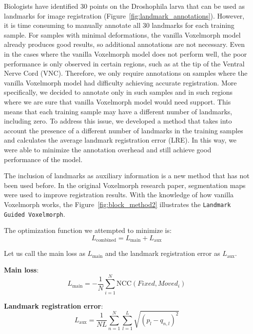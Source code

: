 \documentclass{book}
\begin{document}
	Biologists have identified 30 points on the Droshophila larva that can be used as landmarks for image registration (Figure~\ref{fig:landmark_annotations}). However, it is time consuming to manually annotate all 30 landmarks for each training sample. For samples with minimal deformations, the vanilla Voxelmorph model already produces good results, so additional annotations are not necessary. Even in the cases where the vanilla Voxelmorph model does not perform well, the poor performance is only observed in certain regions, such as at the tip of the Ventral Nerve Cord (VNC). Therefore, we only require annotations on samples where the vanilla Voxelmorph model had difficulty achieving accurate registration. More specifically, we decided to annotate only in such samples and in such regions where we are sure that vanilla Voxelmorph model would need support. This means that each training sample may have a different number of landmarks, including zero. To address this issue, we developed a method that takes into account the presence of a different number of landmarks in the training samples and calculates the average landmark registration error (LRE). In this way, we were able to minimize the annotation overhead and still achieve good performance of the model.
	
	The inclusion of landmarks as auxiliary information is a new method that has not been used before. In the original Voxelmorph research paper, segmentation maps were used to improve registration results. With the knowledge of how vanilla Voxelmorph works, the Figure~\ref{fig:block_method2} illustrates the \texttt{Landmark Guided Voxelmorph}.
	
	The optimization function we attempted to minimize is:
	\begin{equation}
	L_\text{combined} = L_\text{main} + L_\text{aux} \label{eqn:combined_loss}
	\end{equation}	
	
	Let us call the main loss as $L_\text{main}$ and the landmark registration error as $L_\text{aux}$.
	
	\textbf{Main loss}:
	\begin{equation}
	L_\text{main} = -\frac{1}{N} \sum_{i=1}^N \text{NCC}(Fixed, Moved_i) \label{eqn:main_loss}
	\end{equation}
	
	\textbf{Landmark registration error}:
	\begin{equation}
		L_\text{aux} = \frac{1}{NL} \sum_{n=1}^N \sum_{l=1}^L \sqrt{(p_l - q_{n,l})^2}
		\label{eqn:aux_loss}
	\end{equation}
	
\end{document}
